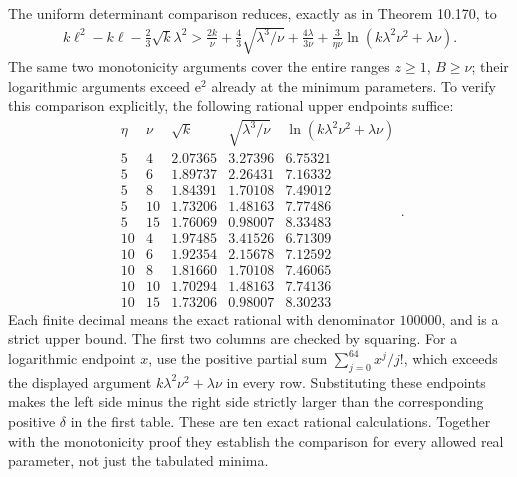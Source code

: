 \documentclass[
  11pt,
  a4paper,
]{article}
\begin{document}
The uniform determinant comparison reduces, exactly as in Theorem
10.170, to \[
\begin{aligned}
k\ell^2-k\ell-\frac23\sqrt{k}\lambda^2
\mathrel{>}\frac{2k}{\nu}
\mathbin{+}\frac43\sqrt{\lambda^3/\nu}
\mathbin{+}\frac{4\lambda}{3\nu}
\mathbin{+}\frac{3}{\eta\nu}\ln(k\lambda^2\nu^2+\lambda\nu).
\end{aligned}
\tag{10.636}
\] The same two monotonicity arguments cover the entire ranges
\(z\ge1\), \(B\ge\nu\); their logarithmic arguments exceed
\(\mathrm e^2\) already at the minimum parameters. To verify this
comparison explicitly, the following rational upper endpoints suffice:
\[
\begin{array}{cc|rrr}
\eta&\nu&\sqrt{k}&\sqrt{\lambda^3/\nu}
&\ln(k\lambda^2\nu^2+\lambda\nu)\\ \hline
5&4&2.07365&3.27396&6.75321\\
5&6&1.89737&2.26431&7.16332\\
5&8&1.84391&1.70108&7.49012\\
5&10&1.73206&1.48163&7.77486\\
5&15&1.76069&0.98007&8.33483\\
10&4&1.97485&3.41526&6.71309\\
10&6&1.92354&2.15678&7.12592\\
10&8&1.81660&1.70108&7.46065\\
10&10&1.70294&1.48163&7.74136\\
10&15&1.73206&0.98007&8.30233
\end{array}.
\tag{10.637}
\] Each finite decimal means the exact rational with denominator
\(100000\), and is a strict upper bound. The first two columns are
checked by squaring. For a logarithmic endpoint \(x\), use the positive
partial sum \(\sum_{j=0}^{64}x^j/j!\), which exceeds the displayed
argument \(k\lambda^2\nu^2+\lambda\nu\) in every row. Substituting these
endpoints makes the left side minus the right side strictly larger than
the corresponding positive \(\delta\) in the first table. These are ten
exact rational calculations. Together with the monotonicity proof they
establish the comparison for every allowed real parameter, not just the
tabulated minima.
\end{document}
